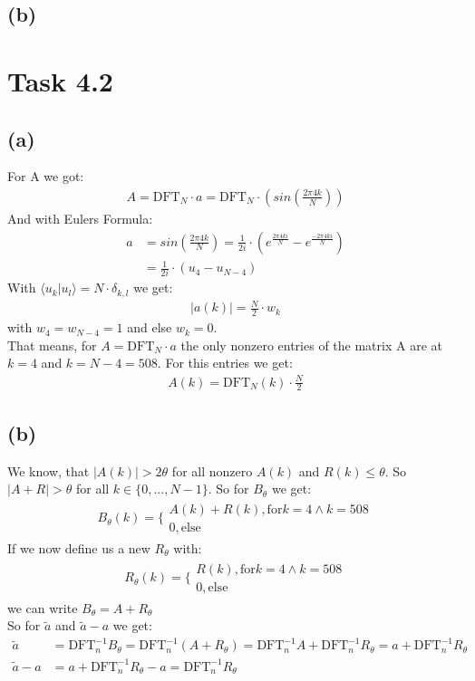 \documentclass[12pt]{article}
\begin{document}
\subsection*{(b)}


\section*{Task 4.2}
\subsection*{(a)}
For A we got:
\begin{align*}
A = \text{DFT}_N \cdot a = \text{DFT}_N \cdot \left(sin\left(\frac{2\pi 4 k}{N}\right) \right)
\end{align*}
And with Eulers Formula:
\begin{align*}
  a &= sin\left(\frac{2\pi 4 k}{N}\right) = \frac{1}{2i} \cdot \left(e^{\frac{2\pi 4 ki}{N}}-e^{\frac{- 2\pi 4 ki}{N}}\right)\\
  &= \frac{1}{2i} \cdot (u_4 - u_{N-4})
\end{align*}
With $\langle u_k|u_l \rangle =N \cdot \delta_{k,l}$ we get:
\begin{align*}
  |a(k)| = \frac{N}{2} \cdot w_k
\end{align*}
with $w_4 = w_{N-4} = 1$ and else $w_k=0$.\\
That means, for $A= \text{DFT}_N \cdot a$ the only nonzero entries of the matrix A are at $k=4$ and $k=N-4=508$. For this entries we get:
\begin{align*}
  A(k) = \text{DFT}_N(k) \cdot \frac{N}{2}
\end{align*}

\subsection*{(b)}
We know, that $|A(k)|> 2 \theta$ for all nonzero $A(k)$ and $R(k)\leq \theta$. So $|A+R|>\theta$ for all $k\in \{0,...,N-1\}$. So for $B_\theta$ we get:
\begin{align*}
  B_{\theta}(k) = \big\{ \begin{array}{l} A(k) + R(k), \text{for} k=4 \wedge k=508 \\ 0, \text{else} \end{array}
\end{align*}
If we now define us a new $R_\theta$ with:
\begin{align*}
  R_{\theta}(k) = \big\{ \begin{array}{l} R(k), \text{for} k=4 \wedge k=508 \\ 0, \text{else} \end{array}
\end{align*}
we can write $B_\theta=A + R_\theta$\\
So for $\tilde{a}$ and $\tilde{a}-a$  we get:
\begin{align*}
  \tilde{a} &= \text{DFT}_n^{-1} B_\theta = \text{DFT}_n^{-1} (A + R_\theta) = \text{DFT}_n^{-1} A + \text{DFT}_n^{-1} R_\theta = a + \text{DFT}_n^{-1} R_\theta \\
  \tilde{a}-a &= a + \text{DFT}_n^{-1} R_\theta - a = \text{DFT}_n^{-1} R_\theta
\end{align*}
\end{document}
